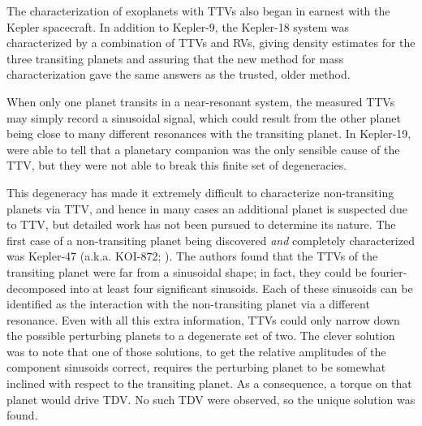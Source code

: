 \documentclass[graybox,natbib,nosecnum]{svmult}
\begin{document}
The characterization of exoplanets with TTVs also began in earnest with the Kepler spacecraft.
In addition to Kepler-9, the Kepler-18 system was characterized by a combination of TTVs and
RVs, giving density estimates for the three transiting planets \citep{2011ApJS..197....7C} and assuring that the new method for mass characterization gave the same answers as the trusted, older method.


When only one planet transits in a near-resonant system, the measured TTVs may simply record a sinusoidal signal, which could result from the other planet being close to many different resonances with the transiting planet.  In Kepler-19, \cite{2011ApJ...743..200B} were able to tell that a planetary companion was the only sensible cause of the TTV, but they were not able to break this finite set of degeneracies. 

This degeneracy has made it extremely difficult to characterize non-transiting planets via TTV, and hence in many cases an additional planet is suspected due to TTV, but detailed work has not been pursued to determine its nature.  The first case of a non-transiting planet being discovered \emph{and} completely characterized was Kepler-47 (a.k.a. KOI-872; \citealt{2012Sci...336.1133N}).  The authors found that the TTVs of the transiting planet were far from a sinusoidal shape; in fact, they could be fourier-decomposed into at least four significant sinusoids.  Each of these sinusoids can be identified as the interaction with the non-transiting planet via a different resonance.  Even with all this extra information, TTVs could only narrow down the possible perturbing planets to a degenerate set of two.  The clever solution \citep{2012Sci...336.1133N} was to note that one of those solutions, to get the relative amplitudes of the component sinusoids correct,  requires the perturbing planet to be somewhat inclined with respect to the transiting planet.  As a consequence, a torque on that planet would drive TDV.  No such TDV were observed, so the unique solution was found. 
\end{document}
